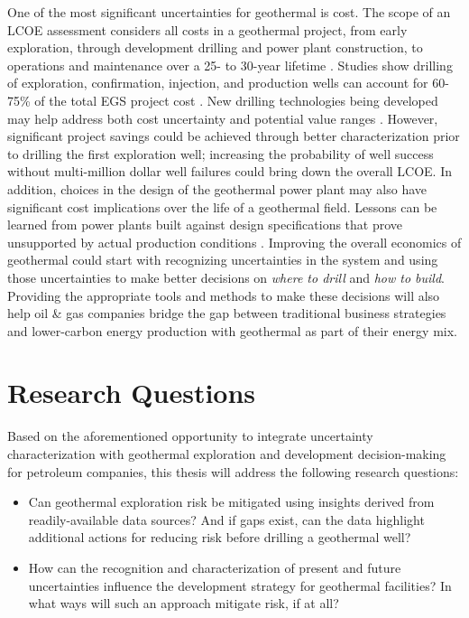 One of the most significant uncertainties for geothermal is cost. The scope of an LCOE assessment considers all costs in a geothermal project, from early exploration, through development drilling and power plant construction, to operations and maintenance over a 25- to 30-year lifetime \citep{beckers_introducing_2013, entingh_volume_2006, tester_economic_1990}. Studies show drilling of exploration, confirmation, injection, and production wells can account for 60-75\% of the total EGS project cost \citep{lukawski_uncertainty_2016, petty_synergies_2009}. New drilling technologies being developed may help address both cost uncertainty and potential value ranges \citep{nrel_2020_2020}. However, significant project savings could be achieved through better characterization prior to drilling the first exploration well; increasing the probability of well success without multi-million dollar well failures could bring down the overall LCOE. In addition, choices in the design of the geothermal power plant may also have significant cost implications over the life of a geothermal field. Lessons can be learned from power plants built against design specifications that prove unsupported by actual production conditions \citep{manente_hybrid_2011}. Improving the overall economics of geothermal could start with recognizing uncertainties in the system and using those uncertainties to make better decisions on \textit{where to drill} and \textit{how to build}. Providing the appropriate tools and methods to make these decisions will also help oil \& gas companies bridge the gap between traditional business strategies and lower-carbon energy production with geothermal as part of their energy mix.

\section{Research Questions}\label{ch1:researchqs}
Based on the aforementioned opportunity to integrate uncertainty characterization with geothermal exploration and development decision-making for petroleum companies, this thesis will address the following research questions:

\begin{itemize}
  \item Can geothermal exploration risk be mitigated using insights derived from readily-available data sources? And if gaps exist, can the data highlight additional actions for reducing risk before drilling a geothermal well?
  \item How can the recognition and characterization of present and future uncertainties influence the development strategy for geothermal facilities? In what ways will such an approach mitigate risk, if at all?
\end{itemize}

